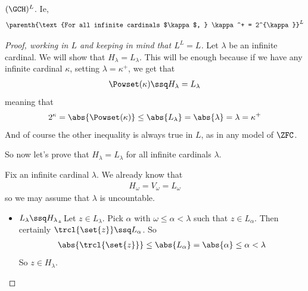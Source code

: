 \begin{boxtheorem}[Working in $L$] \label{Ch3:Thm:GCH_In_L}
    $(\GCH)^L$. Ie,
    \begin{align*}
        \parenth{\text{For all infinite cardinals $\kappa$, } \kappa^+ = 2^{\kappa}}^L
    \end{align*}
\end{boxtheorem}
\begin{proof}[Proof, working in $L$ and keeping in mind that $L^L = L$]
    Let $\lambda$ be an infinite cardinal. We will show that $H_{\lambda} = L_{\lambda}$. This will be enough because if we have any infinite cardinal $\kappa$, setting $\lambda = \kappa^+$, we get that
    \begin{align*}
        \Powset(\kappa) \ssq H_{\lambda} = L_{\lambda}
    \end{align*}
    meaning that
    \begin{align*}
        2^{\kappa} = \abs{\Powset(\kappa)} \leq \abs{L_{\lambda}} = \abs{\lambda} = \lambda = \kappa^+
    \end{align*}
    And of course the other inequality is always true in $L$, as in any model of $\ZFC$.

    So now let's prove that $H_{\lambda} = L_{\lambda}$ for all infinite cardinals $\lambda$.

    Fix an infinite cardinal $\lambda$. We already know that
    \begin{align*}
        H_{\omega} = V_{\omega} = L_{\omega}
    \end{align*}
    so we may assume that $\lambda$ is uncountable.
    \begin{itemize}
        \item \underline{$L_{\lambda} \ssq H_{\lambda}$.} Let $z \in L_{\lambda}$. Pick $\alpha$ with $\omega \leq \alpha < \lambda$ such that $z \in L_{\alpha}$. Then certainly $\trcl{\set{z}} \ssq L_{\alpha}$. So
        \begin{align*}
            \abs{\trcl{\set{z}}} \leq \abs{L_{\alpha}} = \abs{\alpha}\leq \alpha < \lambda
        \end{align*}
        So $z \in H_{\lambda}$.


\end{itemize}
\end{proof}
